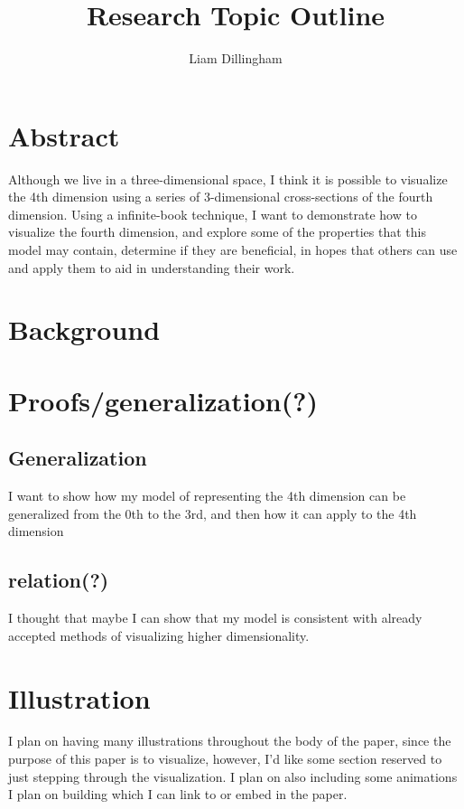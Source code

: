 \documentclass[20pt]{article} %
\title{Research Topic Outline}
\author{Liam Dillingham}
\begin{document}
\maketitle

\section{Abstract}
Although we live in a three-dimensional space, I think it is possible to visualize the 4th dimension using a series of 3-dimensional cross-sections of the fourth dimension.  Using a infinite-book technique, I want to demonstrate how to visualize the fourth dimension, and explore some of the properties that this model may contain, determine if they are beneficial, in hopes that others can use and apply them to aid in understanding their work.

\section{Background}

\section{Proofs/generalization(?)}
\subsection{Generalization}
I want to show how my model of representing the 4th dimension can be generalized from the 0th to the 3rd, and then how it can apply to the 4th dimension
\subsection{relation(?)}
I thought that maybe I can show that my model is consistent with already accepted methods of visualizing higher dimensionality.

\newpage
\section{Illustration}
I plan on having many illustrations throughout the body of the paper, since the purpose of this paper is to visualize, however, I'd like some section reserved to just stepping through the visualization.  I plan on also including some animations I plan on building which I can link to or embed in the paper.
\end{document}
